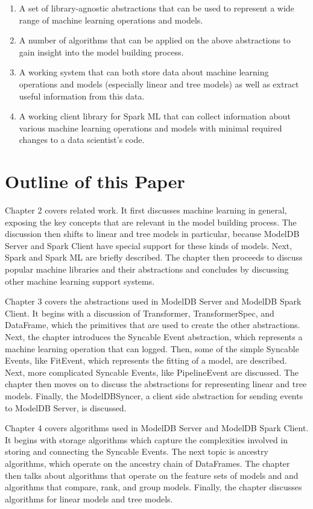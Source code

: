 \begin{enumerate}
  \item A set of library-agnostic abstractions that can be used to
    represent a wide range of machine learning operations and models.
  \item A number of algorithms that can be applied on the above abstractions
    to gain insight into the model building process.
  \item A working system that can both store data about 
    machine learning operations and models (especially linear and tree models) 
    as well as extract useful information from this data.
  \item A working client library for Spark ML that can collect information 
    about various  machine learning operations and models with 
    minimal required changes to a data scientist's code.
\end{enumerate}


\section{Outline of this Paper}

Chapter 2 covers related work. It first discusses machine learning in general,
exposing the key concepts that are relevant in the model building process. The
discussion then shifts to linear and tree models in particular, because ModelDB
Server and Spark Client have special support for these kinds of models. Next, Spark
and Spark ML are briefly described. The chapter then proceeds to discuss popular
machine libraries and their abstractions and concludes by discussing other machine
learning support systems.

Chapter 3 covers the abstractions used in ModelDB Server and ModelDB Spark Client.
It begins with a discussion of Transformer, TransformerSpec, and DataFrame, which 
the primitives that are used to create the other abstractions. Next, the chapter
introduces the Syncable Event abstraction, which represents a machine learning
operation that can logged. Then, some of the simple Syncable Events, like FitEvent,
which represents the fitting of a model, are described. Next, more complicated Syncable
Events, like PipelineEvent are discussed. The chapter then moves on to discuss the
abstractions for representing linear and tree models. Finally, the ModelDBSyncer,
a client side abstraction for sending events to ModelDB Server, is discussed.

Chapter 4 covers algorithms used in ModelDB Server and ModelDB Spark Client. It 
begins with storage algorithms which capture the complexities involved in storing
and connecting the Syncable Events. The next topic is ancestry algorithms, which
operate on the ancestry chain of DataFrames. The chapter then talks about algorithms
that operate on the feature sets of models and and algorithms that compare, rank,
and group models. Finally, the chapter discusses algorithms for linear models
and tree models.

